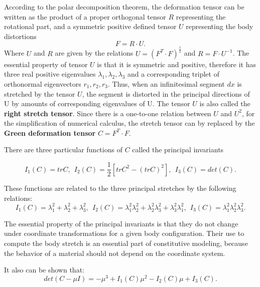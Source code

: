 According to the polar decomposition theorem, the deformation tensor can be written as the product of a proper orthogonal tensor $R$ representing the rotational part, and a symmetric positive defined tensor $U$ representing the body distortions 
\begin{equation}
F = R \cdot U.
\end{equation}
Where $U$ and $R$ are given by the relations $U = (F^T \cdot F)^ {\frac{1}{2}} $ and $R = F \cdot U^{-1}$. The essential property of tensor $U$ is that it is symmetric and positive, therefore it has three real positive eigenvalues
$\lambda_1, \lambda_2, \lambda_3$ and a corresponding triplet of orthonormal eigenvectors $r_1, r_2, r_3$. Thus, when an infinitesimal segment $dx$ is stretched by the tensor $U$, the segment is distorted in the principal directions of U by amounts of corresponding eigenvalues of U. The tensor $U$ is also called the \textbf{right stretch tensor}.  Since there is a one-to-one relation between $U$ and $U^2$, for the simplification of numerical calculus, the stretch tensor can by replaced by the \textbf{Green deformation tensor} $C = F^T \cdot F$.



There are three particular functions of $C$ called the principal invariants

\begin{equation}
\label{principal_invariants}
I_1(C) = tr C, \ \ I_2(C)=\frac{1}{2}\left[ trC^2 - \left(tr C \right)^2 \right], \ \ I_3(C)=det(C) .
\end{equation} 

These functions are related to the three principal stretches by the following relations:
\begin{equation}
\label{principalstrechinvariantsrelation}
I_1(C) = \lambda_1^2+\lambda_2^2+\lambda_3^2, \ \ I_2(C) = \lambda_1^2 \lambda_2^2 + \lambda_2^2 \lambda_3^2+ \lambda_3^2 \lambda_1^2, \ \ I_3(C) = \lambda_1^2 \lambda_2^2 \lambda_3^2.
\end{equation}

The essential property of the principal invariants is that they do not change under coordinate transformations for a given body configuration. Their use to compute the body stretch is an essential part of constitutive modeling, because the behavior of a material should not depend on the coordinate system.

It also can be shown that:
\begin{equation}
\label{eq:detinvariantrelation}
det(C-\mu I) = -\mu ^3+I_1(C)\mu ^2-I_2(C)\mu +I_3(C).
\end{equation} 



